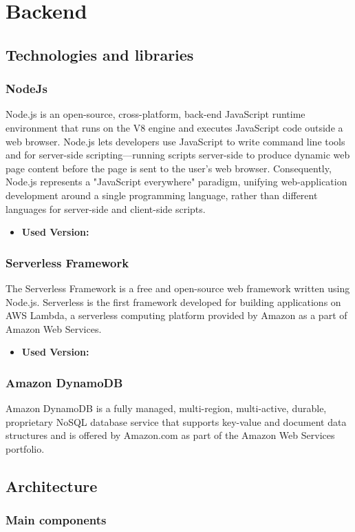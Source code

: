 \section{Backend}
\subsection{Technologies and libraries}
\subsubsection{NodeJs}
Node.js is an open-source, cross-platform, back-end JavaScript runtime environment that runs on the
V8 engine and executes JavaScript code outside a web browser. Node.js lets developers use JavaScript
to write command line tools and for server-side scripting—running scripts server-side to produce
dynamic web page content before the page is sent to the user’s web browser. Consequently, Node.js
represents a "JavaScript everywhere" paradigm, unifying web-application development around a single
programming language, rather than different languages for server-side and client-side scripts.
\begin{itemize}
    \item \textbf{Used Version:}
\end{itemize}
\subsubsection{Serverless Framework}
The Serverless Framework is a free and open-source web framework written using Node.js. Serverless is the first
framework developed for building applications on AWS Lambda, a serverless computing platform provided
by Amazon as a part of Amazon Web Services.
\begin{itemize}
    \item \textbf{Used Version:}
\end{itemize}
\subsubsection{Amazon DynamoDB}
Amazon DynamoDB is a fully managed, multi-region, multi-active, durable, proprietary NoSQL database service that supports key-value
and document data structures and is offered by Amazon.com as part of the Amazon Web Services
portfolio.
\subsection{Architecture}
\subsubsection{Main components}
